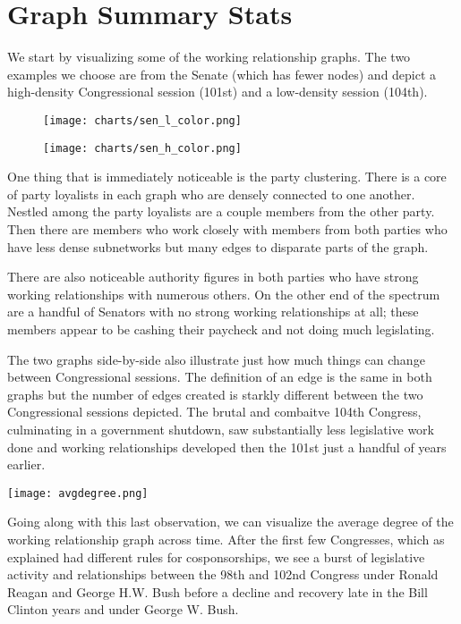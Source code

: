 \section{Graph Summary Stats}

We start by visualizing some of the working relationship graphs. The two examples we choose are from the Senate (which has fewer nodes) and depict a high-density Congressional session (101st) and a low-density session (104th).

\begin{figure}[htbp]
  \centering
  \begin{minipage}[h]{0.4\textwidth}
    \texttt{[image: charts/sen\_l\_color.png]}
  \end{minipage}
  \hfill
  \begin{minipage}[h]{0.4\textwidth}
    \texttt{[image: charts/sen\_h\_color.png]}
  \end{minipage}
\end{figure}

One thing that is immediately noticeable is the party clustering. There is a core of party loyalists in each graph who are densely connected to one another. Nestled among the party loyalists are a couple members from the other party. Then there are members who work closely with members from both parties who have less dense subnetworks but many edges to disparate parts of the graph. 

There are also noticeable authority figures in both parties who have strong working relationships with numerous others. On the other end of the spectrum are a handful of Senators with no strong working relationships at all; these members appear to be cashing their paycheck and not doing much legislating.

The two graphs side-by-side also illustrate just how much things can change between Congressional sessions. The definition of an edge is the same in both graphs but the number of edges created is starkly different between the two Congressional sessions depicted. The brutal and combaitve 104th Congress, culminating in a government shutdown, saw substantially less legislative work done and working relationships developed then the 101st just a handful of years earlier.

\texttt{[image: avgdegree.png]}

Going along with this last observation, we can visualize the average degree of the working relationship graph across time. After the first few Congresses, which as explained had different rules for cosponsorships, we see a burst of legislative activity and relationships between the 98th and 102nd Congress under Ronald Reagan and George H.W. Bush before a decline and recovery late in the Bill Clinton years and under George W. Bush.

